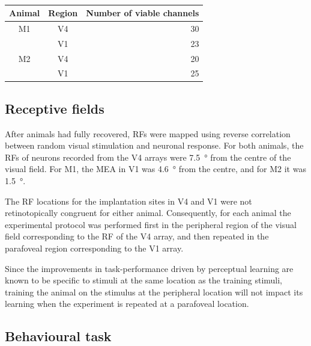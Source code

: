 \begin{table}[bthp]
\begin{center}
\begin{tabular}{ccr}
\toprule
Animal   & Region   & Number of viable channels \\
\midrule
\acs{M1} & \acs{V4} & 30 \\
         & \acs{V1} & 23 \\
\acs{M2} & \acs{V4} & 20 \\
         & \acs{V1} & 25 \\
\bottomrule
\end{tabular}
\end{center}
\caption{
}
\label{tab:nchannels}
\end{table}


\subsection{Receptive fields}

After animals had fully recovered, \acp{RF} were mapped using reverse correlation between random visual stimulation and neuronal response.
For both animals, the \acp{RF} of neurons recorded from the \ac{V4} arrays were \SI{7.5}{\degree} from the centre of the visual field.
For \ac{M1}, the \ac{MEA} in \ac{V1} was \SI{4.6}{\degree} from the centre, and for \ac{M2} it was \SI{1.5}{\degree}.

The \ac{RF} locations for the implantation sites in \ac{V4} and \ac{V1} were not retinotopically congruent for either animal.
Consequently, for each animal the experimental protocol was performed first in the peripheral region of the visual field corresponding to the \ac{RF} of the \ac{V4} array, and then repeated in the parafoveal region corresponding to the \ac{V1} array.

Since the improvements in task-performance driven by perceptual learning are known to be specific to stimuli at the same location as the training stimuli, training the animal on the stimulus at the peripheral location will not impact its learning when the experiment is repeated at a parafoveal location.


\subsection{Behavioural task}
\label{sec:pl_task}

